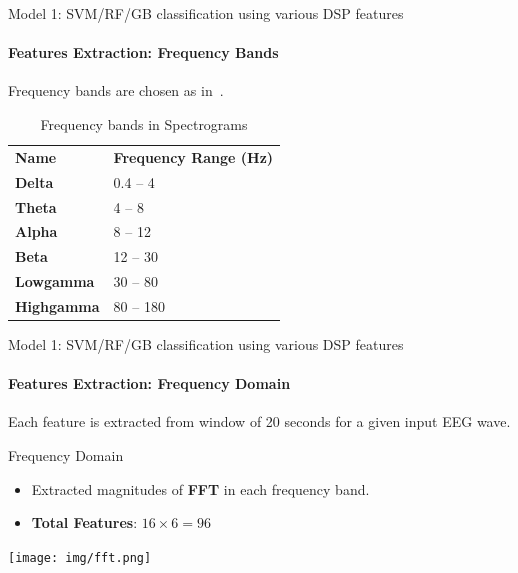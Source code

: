 \documentclass{beamer}
\begin{document}


\begin{frame}{Model 1: SVM/RF/GB classification using various DSP features}
  \framesubtitle{Features Extraction: Frequency Bands}

  Frequency bands are chosen as in~\cite{korshunova_faculty_2015}.
  
  \begin{block}{}
    \begin{table}[]
      \centering
      \caption{Frequency bands in Spectrograms}
      \begin{tabular}{ll}
        \textbf{Name}               & \textbf{Frequency Range (Hz)} \\
        \textbf{Delta}     & 0.4 -- 4                      \\
        \textbf{Theta}     & 4 -- 8                        \\
        \textbf{Alpha}     & 8 -- 12                       \\
        \textbf{Beta}      & 12 -- 30                      \\
        \textbf{Lowgamma}  & 30 -- 80                      \\
        \textbf{Highgamma} & 80 -- 180                    
      \end{tabular}
    \end{table}
  \end{block}

\end{frame}

\begin{frame}{Model 1: SVM/RF/GB classification using various DSP features}
  \framesubtitle{Features Extraction: Frequency Domain}

  Each feature is extracted from window of 20 seconds for a given input EEG
  wave.
  
  \begin{block}{Frequency Domain}
    \begin{itemize}
    \item Extracted magnitudes of \textbf{FFT} in each frequency band.
    \item \textbf{Total Features}: $16 \times 6 = 96$
    \end{itemize}
  \end{block}
  
  \begin{center}
    \texttt{[image: img/fft.png]}
  \end{center}
    
\end{frame}
\end{document}
